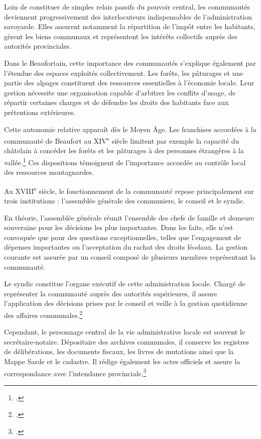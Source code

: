 \documentclass[12pt,a4paper]{report}
\begin{document}
Loin de constituer de simples relais passifs du pouvoir central, les communautés deviennent progressivement des interlocuteurs indispensables de l'administration savoyarde. Elles assurent notamment la répartition de l'impôt entre les habitants, gèrent les biens communaux et représentent les intérêts collectifs auprès des autorités provinciales.

Dans le Beaufortain, cette importance des communautés s'explique également par l'étendue des espaces exploités collectivement. Les forêts, les pâturages et une partie des alpages constituent des ressources essentielles à l'économie locale. Leur gestion nécessite une organisation capable d'arbitrer les conflits d'usage, de répartir certaines charges et de défendre les droits des habitants face aux prétentions extérieures.

Cette autonomie relative apparaît dès le Moyen Âge. Les franchises accordées à la communauté de Beaufort au XIV\textsuperscript{e} siècle limitent par exemple la capacité du châtelain à concéder les forêts et les pâturages à des personnes étrangères à la vallée.\footcite[65]{Mouthon2016} Ces dispositions témoignent de l'importance accordée au contrôle local des ressources montagnardes.

Au XVIII\textsuperscript{e} siècle, le fonctionnement de la communauté repose principalement sur trois institutions : l'assemblée générale des communiers, le conseil et le syndic.

En théorie, l'assemblée générale réunit l'ensemble des chefs de famille et demeure souveraine pour les décisions les plus importantes. Dans les faits, elle n'est convoquée que pour des questions exceptionnelles, telles que l'engagement de dépenses importantes ou l'acceptation du rachat des droits féodaux. La gestion courante est assurée par un conseil composé de plusieurs membres représentant la communauté.

Le syndic constitue l'organe exécutif de cette administration locale. Chargé de représenter la communauté auprès des autorités supérieures, il assure l'application des décisions prises par le conseil et veille à la gestion quotidienne des affaires communales.\footcite[22]{BordeVibertGuigue1971VieRuraleBeaufort}

Cependant, le personnage central de la vie administrative locale est souvent le secrétaire-notaire. Dépositaire des archives communales, il conserve les registres de délibérations, les documents fiscaux, les livres de mutations ainsi que la Mappe Sarde et le cadastre. Il rédige également les actes officiels et assure la correspondance avec l'intendance provinciale.\footcite[22]{BordeVibertGuigue1971VieRuraleBeaufort}
\end{document}
